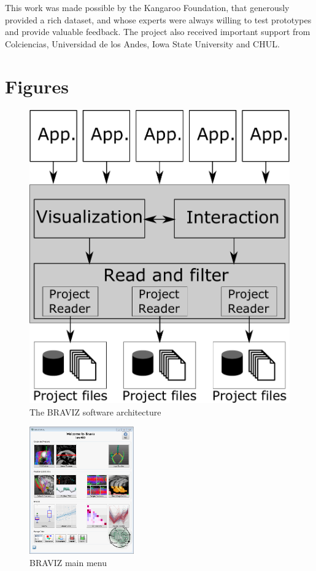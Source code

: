 \documentclass{frontiersHLTH}
\begin{document}
This work was made possible by the Kangaroo Foundation, that generously provided a rich dataset, and whose experts were always willing to test prototypes and provide valuable feedback. The project also received important support from Colciencias, Universidad de los Andes, Iowa State University and CHUL.




\section*{Figures}

\begin{figure}
\begin{center}
\includegraphics[width=0.6\linewidth]{arquitecture.pdf}
\end{center}
 \caption{\label{fig_arch} The BRAVIZ software architecture}
\end{figure}

\begin{figure}
\begin{center}
\includegraphics[width=0.4\textwidth]{braviz_menu}
\end{center}
 \caption{\label{fig_menu} BRAVIZ main menu }
\end{figure}
\end{document}
